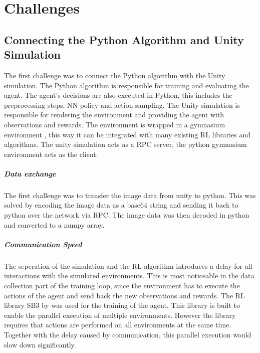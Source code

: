 \chapter{Challenges}
\label{cha:challenges}

\section{Connecting the Python Algorithm and Unity Simulation}

The first challenge was to connect the Python algorithm with the Unity simulation. The Python algorithm is responsible for training and evaluating the agent. The agent's decisions are also executed in Python, this includes the preprocessing steps, \ac{NN} policy and action sampling. The Unity simulation is responsible for rendering the environment and providing the agent with observations and rewards. The environment is wrapped in a gymnasium environment \autocite{gymnasium}, this way it can be integrated with many existing \ac{RL} libraries and algorithms. The unity simulation acts as a \ac{RPC} server, the python gymnasium environment acts as the client.

\paragraph{Data exchange}
The first challenge was to transfer the image data from unity to python. This was solved by encoding the image data as a base64 string and sending it back to python over the network via \ac{RPC}. The image data was then decoded in python and converted to a numpy array.


\paragraph{Communication Speed}
The seperation of the simulation and the \ac{RL} algorithm introduces a delay for all interactions with the simulated environments. This is most noticeable in the data collection part of the training loop, since the environment has to execute the actions of the agent and send back the new observations and rewards. 
The \ac{RL} library \ac{SB3} by \textcite{sb3} was used for the training of the agent. This library is built to enable the parallel execution of multiple environments. However the library requires that actions are performed on all environments at the same time. Together with the delay caused by communication, this parallel execution would slow down significantly.

